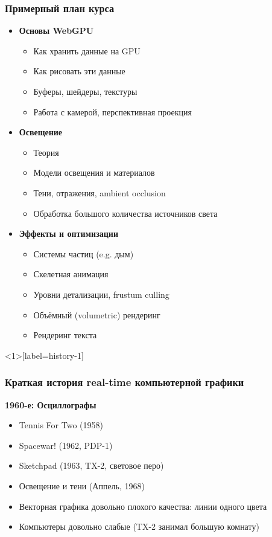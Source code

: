 \documentclass[10pt]{beamer}
\begin{document}
\begin{frame}
\frametitle{Примерный план курса}
\pause
\begin{itemize}
\item \textbf{Основы WebGPU}
\begin{itemize}
\item Как хранить данные на GPU
\item Как рисовать эти данные
\item Буферы, шейдеры, текстуры
\item Работа с камерой, перспективная проекция
\end{itemize}
\pause
\item \textbf{Освещение}
\begin{itemize}
\item Теория
\item Модели освещения и материалов
\item Тени, отражения, ambient occlusion
\item Обработка большого количества источников света
\end{itemize}
\pause
\item \textbf{Эффекты и оптимизации}
\begin{itemize}
\item Системы частиц (e.g. дым)
\item Скелетная анимация
\item Уровни детализации, frustum culling
\item Объёмный (volumetric) рендеринг
\item Рендеринг текста
\end{itemize}
\end{itemize}
\end{frame}

\begin{frame}<1>[label=history-1]
\frametitle{Краткая история real-time компьютерной графики}
\textbf{1960-е: Осциллографы}
\pause
\begin{itemize}
\item Tennis For Two (1958)
\pause
\item Spacewar! (1962, PDP-1)
\pause
\item Sketchpad (1963, TX-2, световое перо)
\pause
\item Освещение и тени (Аппель, 1968)
\pause
\item Векторная графика довольно плохого качества: линии одного цвета
\item Компьютеры довольно слабые (TX-2 занимал большую комнату)
\end{itemize}
\end{frame}
\end{document}
